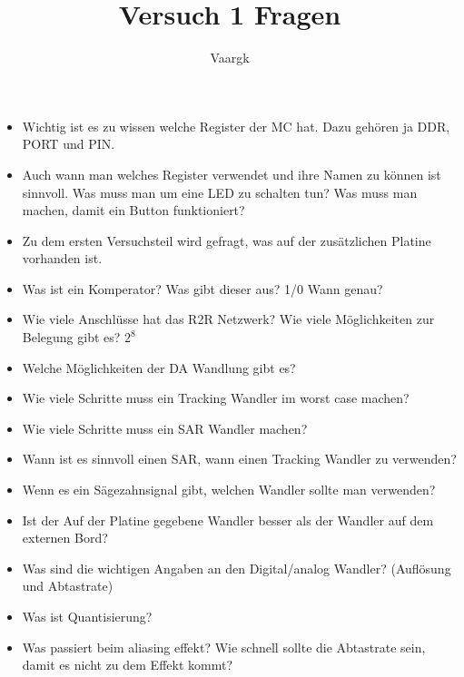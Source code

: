 \documentclass[12pt]{article}
\title{Versuch 1 Fragen}
\author{
        Vaargk
}
\begin{document}
\maketitle
\begin{itemize}
    \item Wichtig ist es zu wissen welche Register der MC hat. Dazu gehören ja DDR, PORT und PIN.
    \item Auch wann man welches Register verwendet und ihre Namen zu können ist sinnvoll. Was muss man um eine LED zu schalten tun? Was muss man machen, damit ein Button funktioniert?
    \item Zu dem ersten Versuchsteil wird gefragt, was auf der zusätzlichen Platine vorhanden ist.
    \item Was ist ein Komperator? Was gibt dieser aus? 1/0 Wann genau?
    \item Wie viele Anschlüsse hat das R2R Netzwerk? Wie viele Möglichkeiten zur Belegung gibt es? $2^8$
    \item Welche Möglichkeiten der DA Wandlung gibt es? 
    \item Wie viele Schritte muss ein Tracking Wandler im worst case machen?
    \item Wie viele Schritte muss ein SAR Wandler machen?
    \item Wann ist es sinnvoll einen SAR, wann einen Tracking Wandler zu verwenden?
    \item Wenn es ein Sägezahnsignal gibt, welchen Wandler sollte man verwenden?
    \item Ist der Auf der Platine gegebene Wandler besser als der Wandler auf dem externen Bord?
    \item Was sind die wichtigen Angaben an den Digital/analog Wandler? (Auflösung und Abtastrate)
    \item Was ist Quantisierung?
    \item Was passiert beim aliasing effekt? Wie schnell sollte die Abtastrate sein, damit es nicht zu dem Effekt kommt?
\end{itemize}
\end{document}
